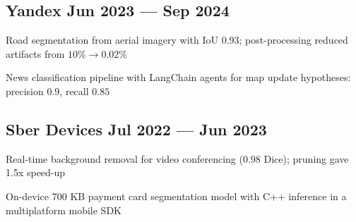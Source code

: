 \subsection{Yandex \hfill Jun 2023 --- Sep 2024}
\begin{zitemize}
\item Road segmentation from aerial imagery with IoU $0.93$; post-processing reduced artifacts from $10\% \to 0.02\%$
\item News classification pipeline with LangChain agents for map update hypotheses: precision $0.9$, recall $0.85$
\end{zitemize}

\subsection{Sber Devices \hfill Jul 2022 --- Jun 2023}
\begin{zitemize}
\item Real-time background removal for video conferencing ($0.98$ Dice); pruning gave 1.5x speed-up
\item On-device 700 KB payment card segmentation model with C++ inference in a multiplatform mobile SDK
\end{zitemize}
